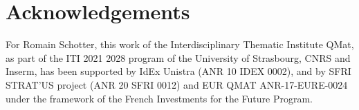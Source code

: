 \chapter*{Acknowledgements}


For Romain Schotter, this work of the Interdisciplinary Thematic Institute QMat, as part of the ITI 2021 2028
program of the University of Strasbourg, CNRS and Inserm, has been supported by IdEx Unistra
(ANR 10 IDEX 0002), and by SFRI STRAT’US project (ANR 20 SFRI 0012) and EUR
QMAT ANR-17-EURE-0024 under the framework of the French Investments for the Future
Program.
